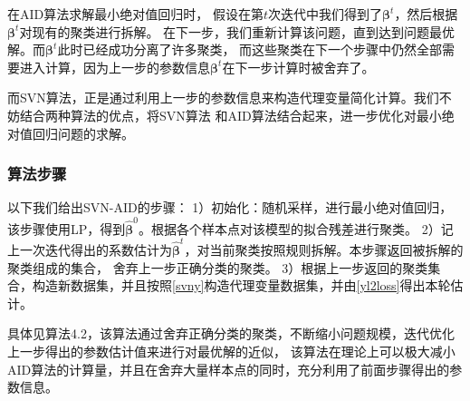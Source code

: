 在AID算法求解最小绝对值回归时，
假设在第$t$次迭代中我们得到了$\bm{\beta}^t$，然后根据$\bm{\beta}^t$对现有的聚类进行拆解。
在下一步，我们重新计算该问题，直到达到问题最优解。而$\bm{\beta}^t$此时已经成功分离了许多聚类，
而这些聚类在下一个步骤中仍然全部需要进入计算，因为上一步的参数信息$\bm{\beta}^t$在下一步计算时被舍弃了。

而SVN算法，正是通过利用上一步的参数信息来构造代理变量简化计算。我们不妨结合两种算法的优点，将SVN算法
和AID算法结合起来，进一步优化对最小绝对值回归问题的求解。

\subsubsection{算法步骤}
以下我们给出SVN-AID的步骤：
1）初始化：随机采样，进行最小绝对值回归，该步骤使用LP，得到$\hat{\bm{\beta}}^0$。根据各个样本点对该模型的拟合残差进行聚类。
2）记上一次迭代得出的系数估计为$\hat{\bm{\beta}}^t$，对当前聚类按照规则拆解。本步骤返回被拆解的聚类组成的集合，
舍弃上一步正确分类的聚类。
3）根据上一步返回的聚类集合，构造新数据集，并且按照\eqref{svny}构造代理变量数据集，并由\eqref{yl2loss}得出本轮估计。

具体见算法4.2，该算法通过舍弃正确分类的聚类，不断缩小问题规模，迭代优化上一步得出的参数估计值来进行对最优解的近似，
该算法在理论上可以极大减小AID算法的计算量，并且在舍弃大量样本点的同时，充分利用了前面步骤得出的参数信息。

